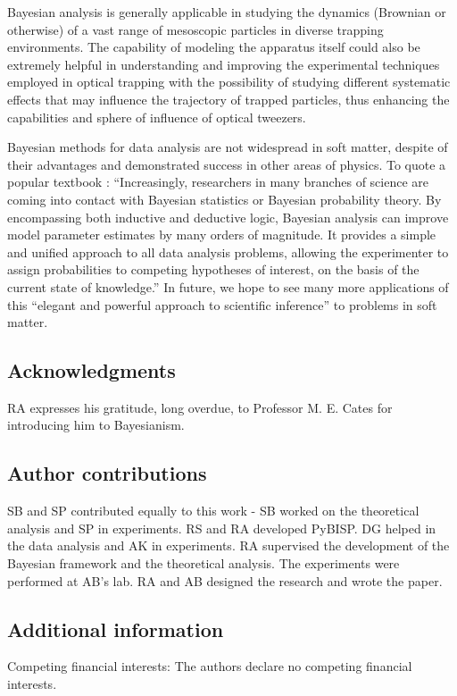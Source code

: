 \documentclass[english,aps, onecolumn, prl,superscriptaddress, notitlepage]{revtex4-1}
\begin{document}
Bayesian analysis is generally applicable in studying the dynamics
(Brownian or otherwise) of a vast range of mesoscopic particles in
diverse trapping environments. The capability of modeling the apparatus
itself could also be extremely helpful in understanding and improving
the experimental techniques employed in optical trapping with the
possibility of studying different systematic effects that may influence
the trajectory of trapped particles, thus enhancing the capabilities
and sphere of influence of optical tweezers.

Bayesian methods for data analysis are not widespread in soft matter,
despite of their advantages and demonstrated success in other areas
of physics. To quote a popular textbook \cite{gregory2005bayesian}:
``Increasingly, researchers in many branches of science are coming
into contact with Bayesian statistics or Bayesian probability theory.
By encompassing both inductive and deductive logic, Bayesian analysis
can improve model parameter estimates by many orders of magnitude.
It provides a simple and unified approach to all data analysis problems,
allowing the experimenter to assign probabilities to competing hypotheses
of interest, on the basis of the current state of knowledge.'' In
future, we hope to see many more applications of this ``elegant and
powerful approach to scientific inference''\cite{gregory2005bayesian}
to problems in soft matter. 
\subsection{Acknowledgments}
RA expresses his gratitude, long overdue, to Professor M. E. Cates
for introducing him to Bayesianism.
\subsection{Author contributions}
SB and SP contributed equally to this work - SB worked on the theoretical analysis and SP in experiments. RS and RA developed PyBISP. DG helped in the data analysis and AK in experiments. RA supervised the development of the Bayesian framework and the theoretical analysis. The experiments were performed at AB's lab. RA and AB designed the research and wrote the paper.
\subsection{Additional information}
Competing financial interests: The authors declare no competing financial interests.
\end{document}
